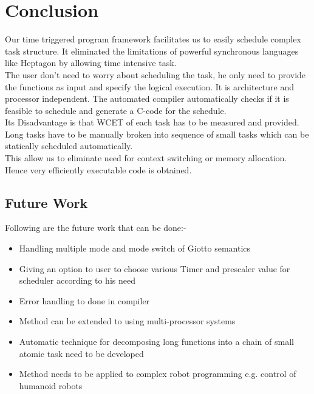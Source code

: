 \documentclass[16pt]{report}
\begin{document}
\chapter{Conclusion}
Our time triggered program framework facilitates us to easily schedule complex task structure. It eliminated the limitations of powerful synchronous languages like Heptagon by allowing time intensive task. \\
The user don't need to worry about scheduling the task, he only need to provide the functions as input and specify the logical execution. It is architecture and processor independent. The automated compiler automatically checks if it is feasible to schedule and generate a C-code for the schedule.\\
Its Disadvantage is that WCET of each task has to be measured and provided. Long tasks have to be manually broken into sequence of small tasks which can be statically scheduled automatically.\\ This allow us to eliminate need for context switching or memory allocation. Hence very efficiently executable code is obtained. 
\section{Future Work}
Following are the future work that can be done:-
\begin{itemize}
    \item Handling multiple mode and mode switch of Giotto semantics
    \item Giving an option to user to choose various Timer and prescaler value for scheduler according to his need
    \item Error handling to done in compiler
    \item Method can be extended to using multi-processor systems
    
    \newpage
    
    \item Automatic technique for decomposing long functions into a chain of small atomic task need to be developed
    \item Method needs to be applied to complex robot programming e.g. control of humanoid robots
\end{itemize}
\end{document}

